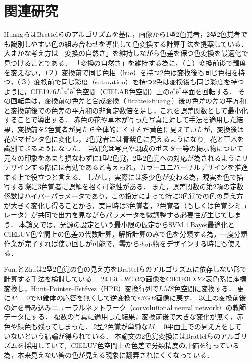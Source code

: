 \documentclass[uplatex,paper=a4,fontsize=4.0truemm,jafontsize=4.0truemm,head_space=30.0truemm,foot_space=30.0truemm,baselineskip=8.0truemm,line_length=40zw,gutter=25.0truemm,oneside,openany,fleqn,hanging_panctuation,open_bracket_pos=nibu_tentsuki,dvipdfmx,jis2004,book,titlepage]{jlreq}
\theoremstyle{mystyle}
\newcommand{\mathdisplaystyle}[1]{\(\displaystyle{#1}\)}
\begin{document}
	\chapter{関連研究}
		HuangらはBrattelらのアルゴリズムを基に，画像から1型2色覚者，2型2色覚者でも識別しやすい色の組み合わせを導出して色変換する計算手法を提案している\cite{Huang2007}．
		大まかな考え方は「変換の自然さ」を維持しながら色差を保つ色変換を最適化で見つけることである．
		「変換の自然さ」を維持する為に，（１）変換前後で輝度を変えない，（２）変換前で同じ色相（hue）を持つ2色は変換後も同じ色相を持つ，（３）変換前で同じ彩度（saturation）を持つ2色は変換後も同じ彩度を持つように，CIE1976\mathdisplaystyle{L^\ast a^\ast b^\ast}色空間（CIELAB色空間）上の\mathdisplaystyle{a^\ast b^\ast}平面を回転する．
		その回転角は，変換前の色差と合成変換（\mathdisplaystyle{\textrm{Brattel}\circ\textrm{Huang}}）後の色差の差の平方和と変換前後での色差の平方和の非負定数倍を足し，これを誤差関数として最小化することで導出する．
		赤色の花や草木が写った写真に対して手法を適用した結果，変換前を2色覚者が見たら全体的にくすんだ黄色に見えていたが，変換後は花がマゼンタ色に変化し，2色覚者には青紫色に見えるようになり，花と草木を識別できるようになった．
		当研究は写真や既成のポスター等の掲示物について元々の印象をあまり損なわずに1型2色覚，2型2色覚への対応が為されるようにリデザインする際には有効であると考えられ，カラーユニバーサルデザインを推進する上で役立つと言える．
		しかし，実際には多少色が変わる為，現実を色で描写する際に3色覚者に誤解を招く可能性がある．
		また，誤差関数の第2項の定数係数はハイパーパラメータであり，この設定によって特に3色覚での色の見え方が大きく変化し得ることから，実用時は3色覚者，2色覚者（もしくは色覚シミュレータ）が共同で出力を見ながらパラメータを微調整する必要性が生じてしまう．
		本論文では，光源の設定という最小限の仮定からSVM＋Bayes最適化とCIELUV色空間上の色差の代数計算，解析計算のみで色を分類する為，一度分類作業が完了すれば使い回しが可能で，零から掲示物をデザインする時にも使える．

		FuntとZhuは2型2色覚の色の見え方をBrattelらのアルゴリズムに依存しない形で計算する手法を検討している\cite{Funt2018}．
		24 bit s\mathdisplaystyle{RGB}の画像をCIE1931\mathdisplaystyle{XYZ}表色系に座標変換し，Hunt--Pointer--Estévez（HPE）変換行列で\mathdisplaystyle{LMS}色空間に変換する．
		更に\mathdisplaystyle{M=0}でM錐体の応答を無くして逆変換でs\mathdisplaystyle{RGB}画像に戻す．
		以上の変換前後の対を畳み込みニューラルネットワーク（convolutional neural network）の教師データにする．
		複数の写真に適用した結果，変換前後で大きな変化が無く，赤色や緑色も残ってしまった．
		2型2色覚が単純な\mathdisplaystyle{M=0}平面上での見え方をしていないという結論が得られている．
		本論文の2色覚変換にはBrattelらのアルゴリズムを採用していて，CIELUV色空間上の色差で分類精度の評価を行っている為，本来見えない筈の色が見える現象に翻弄されにくくなっている．
\end{document}
